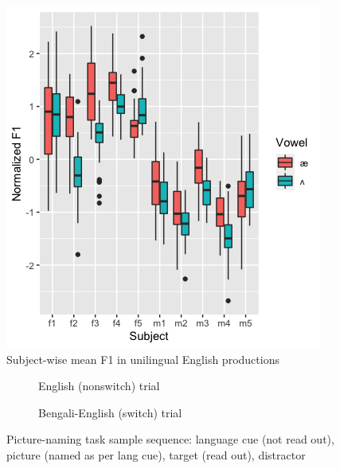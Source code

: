 \documentclass[12 pt]{article}
\begin{document}
\begin{figure}[h] %
	
	\includegraphics[scale=1]{vowel_by_subject_ggplot}
	\caption{Subject-wise mean F1 in unilingual English productions}
	\label{boxplot_F1}
\end{figure}


\newpage

\begin{figure}[!htb] \label{figure_picture_task}
	\centering
	\begin{subfigure}[t]{0.49\textwidth}
		\centering
		
		\caption{English (nonswitch) trial} \label{picture_task_english}
	\end{subfigure}
	\begin{subfigure}[t]{0.49\textwidth}
		\centering
		 
		\caption{Bengali-English (switch) trial} \label{picture_trial_bengali}
	\end{subfigure}
\caption{Picture-naming task sample sequence: language cue (not read out), picture (named as per lang cue), target (read out), distractor}
\end{figure}
\end{document}
